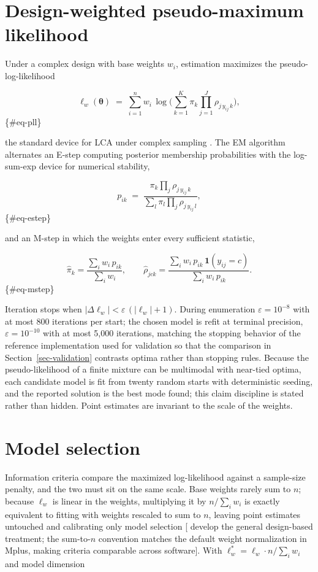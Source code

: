 \documentclass[
  12pt]{article}
\begin{document}
\section{Design-weighted pseudo-maximum likelihood}\label{sec-pml}

Under a complex design with base weights \(w_i\), estimation maximizes
the pseudo-log-likelihood

\[\ell_w(\boldsymbol\theta) \;=\; \sum_{i=1}^{n} w_i \,
\log\!\Big( \sum_{k=1}^{K} \pi_k \prod_{j=1}^{J} \rho_{j\,y_{ij}\,k} \Big),\]
\{\#eq-pll\}

the standard device for LCA under complex sampling
\citep{patterson2002, skinner1989}. The EM algorithm
\citep{dempster1977} alternates an E-step computing posterior membership
probabilities with the log-sum-exp device for numerical stability,

\[p_{ik} \;=\; \frac{\pi_k \prod_j \rho_{j\,y_{ij}\,k}}
{\sum_{l} \pi_l \prod_j \rho_{j\,y_{ij}\,l}},\] \{\#eq-estep\}

and an M-step in which the weights enter every sufficient statistic,

\[\hat\pi_k = \frac{\sum_i w_i\, p_{ik}}{\sum_i w_i}, \qquad
\hat\rho_{jck} = \frac{\sum_i w_i\, p_{ik}\, \mathbf{1}(y_{ij} = c)}
{\sum_i w_i\, p_{ik}} .\] \{\#eq-mstep\}

Iteration stops when \(|\Delta \ell_w| < \varepsilon\,(|\ell_w| + 1)\).
During enumeration \(\varepsilon = 10^{-8}\) with at most 800 iterations
per start; the chosen model is refit at terminal precision,
\(\varepsilon = 10^{-10}\) with at most 5,000 iterations, matching the
stopping behavior of the reference implementation used for validation so
that the comparison in Section~\ref{sec-validation} contrasts optima
rather than stopping rules. Because the pseudo-likelihood of a finite
mixture can be multimodal with near-tied optima, each candidate model is
fit from twenty random starts with deterministic seeding, and the
reported solution is the best mode found; this claim discipline is
stated rather than hidden. Point estimates are invariant to the scale of
the weights.

\section{Model selection}\label{sec-selection}

Information criteria compare the maximized log-likelihood against a
sample-size penalty, and the two must sit on the same scale. Base
weights rarely sum to \(n\); because \(\ell_w\) is linear in the
weights, multiplying it by \(n / \sum_i w_i\) is exactly equivalent to
fitting with weights rescaled to sum to \(n\), leaving point estimates
untouched and calibrating only model selection {[}\citet{lumley2015}
develop the general design-based treatment; the sum-to-\(n\) convention
matches the default weight normalization in Mplus, making criteria
comparable across software{]}. With
\(\ell^{*}_w = \ell_w \cdot n / \sum_i w_i\) and model dimension
\end{document}
